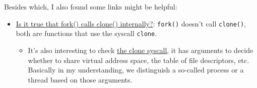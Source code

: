 Besides which, I also found some links might be helpful:
\begin{itemize}
    \item \href{https://stackoverflow.com/a/18904917}{Is it true that fork() calls clone() internally?}: \verb|fork()| doesn't call \verb|clone()|, both are functions that use the syscall \verb|clone|.
    \begin{itemize}
        \item It's also interesting to check \href{https://man7.org/linux/man-pages/man2/clone.2.html}{the clone syscall}, it has arguments to decide whether to share virtual address space, the table of file descriptors, etc. Basically in my understanding, we distinguish a so-called process or a thread based on those arguments.
    \end{itemize}
\end{itemize}